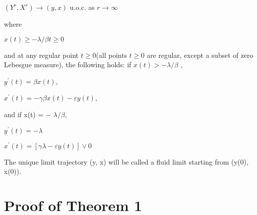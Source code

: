 \begin{center} $(Y^r , X^r)\rightarrow (y,x)$ u.o.c. as $r\rightarrow \infty$
\end{center}

\newline where

\begin{center} $x(t)\geq −\lambda/ \beta t\geq 0$
\end{center}
and at any regular point $t \geq 0 $(all points $t\geq 0$ are regular, except a subset of zero Lebesgue measure), the following holds: if $x(t)> −\lambda/ \beta$ , 
\begin{center} 
\newline $y ^\prime (t) = \beta x(t)$,

\newline $x ^\prime (t) = −\gamma \beta x(t) - \varepsilon y(t)$, 
\end{center}
and if x(t) = − $\lambda/\beta$,
\begin{center} 
\newline $y ^\prime (t) = -\lambda$

\newline $x ^\prime (t) = [\gamma \lambda - \varepsilon y(t)] \vee 0$
\end{center}
The unique limit trajectory (y, x) will be called a fluid limit starting from (y(0), x(0)).
	
\section*{Proof of Theorem 1}

